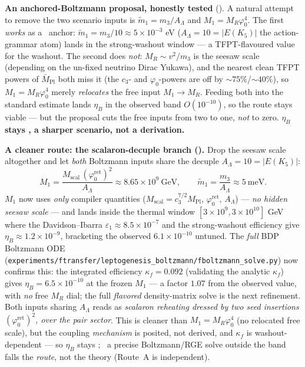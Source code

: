 \documentclass[11pt,a4paper]{article}
\newcommand{\phiz}{\varphi_0^{\mathrm{ret}}}
\newcommand{\cthree}{c_3}
\newcommand{\Mpl}{M_{\mathrm{Pl}}}
\begin{document}
\par\smallskip\noindent\textbf{An anchored-Boltzmann proposal, honestly tested}
().
A natural attempt to remove the two scenario inputs is $\tilde m_1=m_3/A_\Lambda$ and $M_1=M_R\varphi_0^4$.
The first \emph{works} as a \mC\ anchor: $\tilde m_1=m_3/10\approx5\times10^{-3}$ eV ($A_\Lambda=10=|E(K_5)|$
the action-grammar atom) lands in the strong-washout window --- a TFPT-flavoured value for the washout.
The second does \emph{not}: $M_R\sim v^2/m_3$ is the seesaw scale (depending on the un-fixed neutrino Dirac
Yukawa), and the nearest clean TFPT powers of $\bar M_{\mathrm{Pl}}$ both miss it (the $c_3$- and
$\varphi_0$-powers are off by ${\sim}75\%$/${\sim}40\%$), so $M_1=M_R\varphi_0^4$ merely \emph{relocates}
the free input $M_1\!\to\!M_R$. Feeding both into the standard estimate lands $\eta_B$ in the observed
band $O(10^{-10})$, so the route stays viable --- but the proposal cuts the free inputs from two to one,
\emph{not} to zero. \textbf{$\eta_B$ stays \mC, a sharper scenario, not a derivation.}
\par\smallskip\noindent\textbf{A cleaner route: the scalaron-decuple branch
().} Drop the seesaw scale altogether and let \emph{both} Boltzmann
inputs share the decuple $A_\Lambda=10=|E(K_5)|$:
\[
  M_1=\frac{M_{\mathrm{scal}}\,(\phiz)^{2}}{A_\Lambda}\approx8.65\times10^{9}\ \mathrm{GeV},\qquad
  \tilde m_1=\frac{m_3}{A_\Lambda}\approx5\ \mathrm{meV}.
\]
$M_1$ now uses \emph{only} compiler quantities ($M_{\mathrm{scal}}=\cthree^{7/2}\Mpl$, $\phiz$, $A_\Lambda$)
--- \emph{no hidden seesaw scale} --- and lands inside the thermal window $[3\times10^9,3\times10^{10}]$ GeV
where the Davidson--Ibarra $\varepsilon_1\approx8.5\times10^{-7}$ and the strong-washout efficiency give
$\eta_B\approx1.2\times10^{-9}$, bracketing the observed $6.1\times10^{-10}$ untuned. The \emph{full} BDP
Boltzmann ODE (\texttt{experiments/ftransfer/leptogenesis\_boltzmann/fboltzmann\_solve.py}) now confirms
this: the integrated efficiency $\kappa_f=0.092$ (validating the analytic $\kappa_f$) gives
$\eta_B=6.5\times10^{-10}$ at the frozen $M_1$ --- a factor $1.07$ from the observed value, with \emph{no}
free $M_R$ dial; the full \emph{flavored} density-matrix solve is the next refinement. Both inputs sharing
$A_\Lambda$ reads as \emph{scalaron reheating dressed by two seed insertions $(\phiz)^2$, over the pair
sector}. This is cleaner than $M_1=M_R\varphi_0^4$ (no relocated free scale), but the coupling
\emph{mechanism} is posited, not derived, and $\kappa_f$ is washout-dependent --- so $\eta_B$ stays \mC;
\mX\ a precise Boltzmann/RGE solve outside the band falls the \emph{route}, not the theory (Route~A is
independent).
\end{document}

